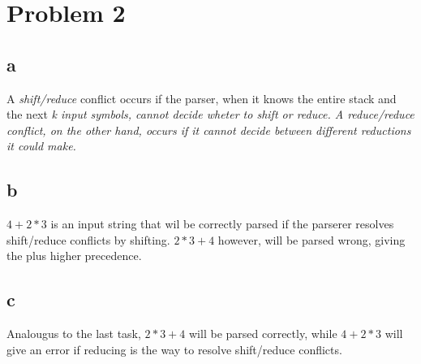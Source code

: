 \documentclass{article}
\begin{document}
\section*{Problem 2}
\subsection*{a}
A \emph{shift/reduce} conflict occurs if the parser, when it knows the entire stack and
the next \em{k} input symbols, cannot decide wheter to shift or reduce. A
\em{reduce/reduce} conflict, on the other hand, occurs if it cannot decide between
different reductions it could make.

\subsection*{b}
$4 + 2 * 3$ is an input string that wil be correctly parsed if the parserer resolves
shift/reduce conflicts by shifting. $2 * 3 + 4$ however, will be parsed wrong, giving
the plus higher precedence.

\subsection*{c}
Analougus to the last task, $2 * 3 + 4$ will be parsed correctly, while $4 + 2 *
3$ will give an error if reducing is the way to resolve shift/reduce conflicts.
\end{document}
